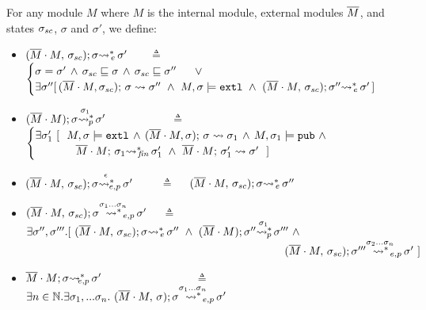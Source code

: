 {\begin{definition}
\label{def:exec:sum}
For any module $M$  where $M$ is the internal module, external modules $\Mtwo$, and states $\sigma\bd$,  $\sigma$ and $\sigma'$, we define:

\begin{itemize}
\item
 ${\leadstoBoundedThreeStarExt {\Mtwo\cdot M} {\sigma\bd}  {\sigma}  {\sigma'}}$ \ \ \ $\triangleq$ \ \ 
{
$
\begin{cases}
\sigma=\sigma' \, \wedge\,  \EarlierS  {\sigma\bd}  {\sigma} \, \wedge\,  \EarlierS  {\sigma\bd}  {\sigma''}\ \ \ \ \ \vee\\
\exists \sigma''[\,  \leadstoBoundedThree {\Mtwo\cdot M} {\sigma}  {\sigma\bd}   {\sigma''} \  \wedge\  M, \sigma  \models  \extThis\  \wedge\ 
{\leadstoBoundedThreeStarExt {\Mtwo\cdot M} {\sigma\bd}  {\sigma''}  {\sigma'}}\, ]
\end{cases}
$
}
\item
${\WithPub {\Mtwo\cdot M}    {\sigma}  {\sigma'} {\sigma_1}}$ \  \ \  \ \ \ \ \ \ \ \ $\triangleq$ \ \ 
$\begin{cases}
\exists   \sigma_1'\ [ \ \   M, \sigma  \models \extThis \, \wedge \,  \leadstoBoundedThree  {\Mtwo\cdot M} {\sigma} {\sigma}  {\sigma_{1}}\, \wedge\,  M, \sigma_1 \models \pubMeth \ \wedge \\ 
\strut \ \ \ \ \  \ \ \ \ \ \   \leadstoBoundedStarFin {\Mtwo\cdot M} {\sigma_1}  {\sigma_1'}  \ \wedge \   \leadstoBounded  {\Mtwo\cdot M} {\sigma_1'}      {\sigma'} \ \ ] 
\end{cases}
$
\item
$\WithExtPub {\Mtwo\cdot M} {\sigma\bd}  {\sigma}  {\sigma'} {\epsilon}$ \ \     \ \  $\triangleq$ \ \ 
$\leadstoBoundedThreeStarExt {\Mtwo\cdot M} {\sigma\bd}  {\sigma}  {\sigma''}$
\item
$\WithExtPub {\Mtwo\cdot M} {\sigma\bd}  {\sigma}  {\sigma'} {\sigma_1...\sigma_n}$   \ \  $\triangleq$ \ \ 
$\exists \sigma'',\sigma'''.[\   {\leadstoBoundedThreeStarExt {\Mtwo\cdot M} {\sigma\bd}  {\sigma}  {\sigma''}}\ \wedge\ 
{\WithPub {\Mtwo\cdot M}    {\sigma''}  {\sigma'''} {\sigma_1}} \ \wedge$\\   
$\strut \hspace{8.2cm} {\WithExtPub {\Mtwo\cdot M} {\sigma\bd}  {\sigma'''}  {\sigma'} {\sigma_2...\sigma_n} }  \ ]$
\item
$\leadstoBoundedExtPub {\Mtwo\cdot M}    {\sigma}  {\sigma'} $   \ \ \ \ \   \ \ \  \ \ \ \   \ \ \ \  $\triangleq$   \ \ 
  $ \exists n\in \mathbb{N}. \exists \sigma_1,...\sigma_n. \ \WithExtPub {\Mtwo\cdot M} {\sigma}  {\sigma}  {\sigma'} {\sigma_1...\sigma_n} 
$
\end{itemize}
\end{definition}

}

